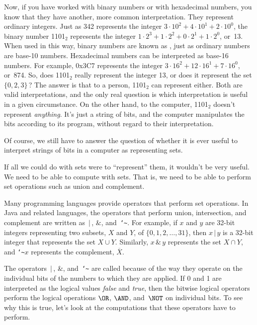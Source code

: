 Now, if you have worked with binary numbers or with hexadecimal
numbers, you know that they have another, more common interpretation.
They represent ordinary integers.  Just as 342 represents the
integer $3\cdot 10^2 + 4\cdot 10^1 +2\cdot 10^0$, the
binary number 1101$_2$ represents the integer
$1\cdot 2^3 +1\cdot 2^2 +0\cdot 2^1 +1\cdot 2^0$, or~13.
When used in this way, binary numbers are known as 
, just as ordinary numbers
are base-10 numbers.  Hexadecimal numbers can be interpreted
as base-16 numbers.  For example, 0x3C7 represents the
integer $3\cdot 16^2 + 12\cdot 16^1 + 7\cdot 16^0$, or~874.
So, does 1101$_2$ really represent the integer 13, or does it
represent the set $\{0,2,3\}\,$?  The answer is that to a person,
1101$_2$ can represent either.  Both are valid interpretations,
and the only real question is which interpretation is useful in
a given circumstance.  On the other hand, to the computer,
1101$_2$ doesn't represent \emph{anything}.  It's just a string
of bits, and the computer manipulates the bits according to its
program, without regard to their interpretation.

Of course, we still have to answer the question of whether it
is ever useful to interpret strings of bits in a computer as
representing sets.

\medbreak

If all we could do with sets were to ``represent'' them, it wouldn't
be very useful.  We need to be able to compute with sets.  That
is, we need to be able to perform set operations such as 
union and complement.

Many programming languages provide operators that perform set
operations.  In Java and related languages, the operators
that perform union, intersection, and complement are written
as $\,|\,$, $\&$, and~\texttt{\char`\~}.  For example, 
if $x$ and $y$ are 32-bit integers representing two subsets,
$X$ and $Y$, of $\{0,1,2,\dots,31\}$, then
$x\,|\,y$ is a 32-bit integer that represents the set $X\cup Y$.
Similarly, $x\,\&\,y$ represents the set $X\cap Y$, and
\texttt{\char`\~}$x$ represents the complement,
$\overline{X}$.

The operators $\,|\,$, \&, and~\texttt{\char`\~}
are called 
because of the way they operate on the individual bits of the numbers
to which they are applied.  If 0 and 1 are interpreted as the
logical values \textit{false} and \textit{true}, then the
bitwise logical operators perform the logical operations
$\OR$, $\AND$, and~$\NOT$ on individual bits.  To see why this
is true, let's look at the computations that these operators
have to perform.

